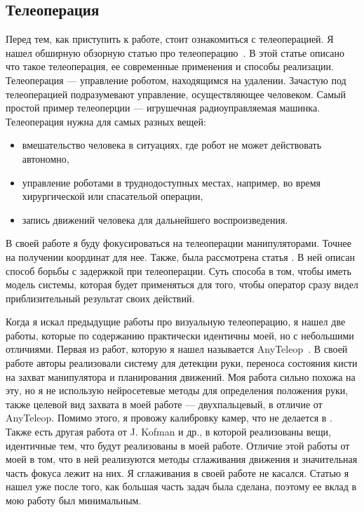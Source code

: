 \documentclass[12pt, a4paper]{article}
\begin{document}
\subsection{Телеоперация}
  Перед тем, как приступить к работе, стоит ознакомиться с телеоперацией. Я
  нашел обширную обзорную статью про телеоперацию~\cite{teleop-survey}. В этой
  статье описано что такое телеоперация, ее современные применения и способы
  реализации. Телеоперация --- управление роботом, находящимся на удалении.
  Зачастую под телеоперацией подразумевают управление, осуществляющее
  человеком. Самый простой пример телеоперции --- игрушечная радиоуправляемая
  машинка. Телеоперация нужна для самых разных вещей: 
  \begin{itemize}
    \item вмешательство человека в ситуациях, где робот не может действовать автономно,
    \item управление роботами в труднодоступных местах, например, во время хирургической или спасательой операции,
    \item запись движений человека для дальнейшего воспроизведения.
  \end{itemize}
  В своей работе я буду фокусироваться на телеоперации манипуляторами. Точнее
  на получении координат для нее. Также, была рассмотрена статья
  \cite{model-teleop}. В ней описан способ борьбы с задержкой при
  телеоперации. Суть способа в том, чтобы иметь модель системы, которая будет
  применяться для того, чтобы оператор сразу видел приблизительный результат
  своих действий.

  Когда я искал предыдущие работы про визуальную телеоперацию, я нашел две
  работы, которые по содержанию практически идентичны моей, но с небольшими
  отличиями. Первая из работ, которую я нашел называется
  AnyTeleop~\cite{anyteleop}. В своей работе авторы реализовали систему для
  детекции руки, переноса состояния кисти на захват манипулятора и планирования
  движений. Моя работа сильно похожа на эту, но я не использую нейросетевые
  методы для определения положения руки, также целевой вид захвата в моей
  работе --- двухпальцевый, в отличие от AnyTeleop. Помимо этого, я провожу
  калибровку камер, что не делается в \cite{anyteleop}. Также есть другая
  работа от J. Kofman и др.\cite{literally-me}, в которой реализованы вещи,
  идентичные тем, что будут реализованы в моей работе. Отличие этой работы от
  моей в том, что в ней реализуются методы сглаживания движения и значительная
  часть фокуса лежит на них. Я сглаживания в своей работе не касался. 
  Статью \cite{literally-me} я нашел уже после того, как большая часть задач
  была сделана, поэтому ее вклад в мою работу был минимальным.
\end{document}
